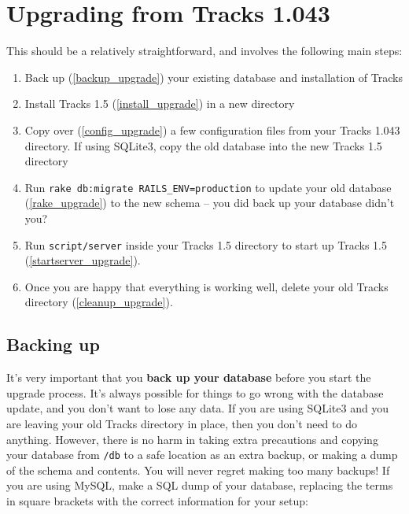 \documentclass[10pt,twoside]{memoir}
\begin{document}
\section{Upgrading from Tracks 1.043}
\label{upgradingfromtracks1.043}

This should be a relatively straightforward, and involves the following main steps:


\begin{enumerate}


\item Back up (\autoref{backup_upgrade}) your existing database and installation of Tracks

\item Install Tracks 1.5 (\autoref{install_upgrade}) in a new directory

\item Copy over (\autoref{config_upgrade}) a few configuration files from your Tracks 1.043 directory. If using SQLite3, copy the old database into the new Tracks 1.5 directory

\item Run \texttt{rake db:migrate RAILS\_ENV=production} to update your old database (\autoref{rake_upgrade}) to the new schema -- you did back up your database didn't you?

\item Run \texttt{script/server} inside your Tracks 1.5 directory to start up Tracks 1.5 (\autoref{startserver_upgrade}).

\item Once you are happy that everything is working well, delete your old Tracks directory (\autoref{cleanup_upgrade}).
\end{enumerate}

\subsection{Backing up}
\label{backup_upgrade}

It's very important that you \textbf{back up your database} before you start the upgrade process. It's always possible for things to go wrong with the database update, and you don't want to lose any data. If you are using SQLite3 and you are leaving your old Tracks directory in place, then you don't need to do anything. However, there is no harm in taking extra precautions and copying your database from \texttt{/db} to a safe location as an extra backup, or making a dump of the schema and contents. You will never regret making too many backups! If you are using MySQL, make a SQL dump of your database, replacing the terms in square brackets with the correct information for your setup:
\end{document}
